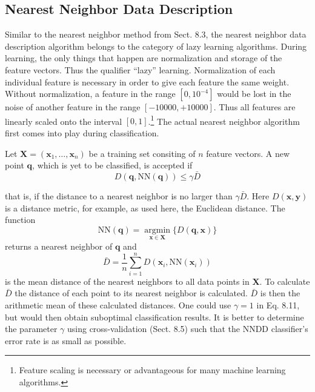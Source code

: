 \documentclass[10pt]{book}
\begin{document}
\subsection{Nearest Neighbor Data Description}
Similar to the nearest neighbor method from Sect. 8.3, the nearest neighbor data description algorithm belongs to the category of lazy learning algorithms. During learning, the only things that happen are normalization and storage of the feature vectors. Thus the qualifier ``lazy'' learning. Normalization of each individual feature is necessary in order to give each feature the same weight. Without normalization, a feature in the range $\left[0,10^{-4}\right]$ would be lost in the noise of another feature in the range $[-10000,+10000]$. Thus all features are linearly scaled onto the interval $[0,1]$.\footnote{Feature scaling is necessary or advantageous for many machine learning algorithms.} The actual nearest neighbor algorithm first comes into play during classification.

Let $\boldsymbol{X}=\left(\boldsymbol{x}_{1}, \ldots, \boldsymbol{x}_{n}\right)$ be a training set consiting of $n$ feature vectors. A new point $\boldsymbol{q}$, which is yet to be classified, is accepted if
\begin{equation*}
D(\boldsymbol{q}, \mathrm{NN}(\boldsymbol{q})) \leq \gamma \bar{D} \tag{8.11}
\end{equation*}

that is, if the distance to a nearest neighbor is no larger than $\gamma \bar{D}$. Here $D(\boldsymbol{x}, \boldsymbol{y})$ is a distance metric, for example, as used here, the Euclidean distance. The function
\[
\mathrm{NN}(\boldsymbol{q})=\underset{\boldsymbol{x} \in \boldsymbol{X}}{\operatorname{argmin}}\{D(\boldsymbol{q}, \boldsymbol{x})\}
\]
returns a nearest neighbor of $\boldsymbol{q}$ and
\[
\bar{D}=\frac{1}{n} \sum_{i=1}^{n} D\left(\boldsymbol{x}_{i}, \mathrm{NN}\left(\boldsymbol{x}_{i}\right)\right)
\]
is the mean distance of the nearest neighbors to all data points in $\boldsymbol{X}$. To calculate $\bar{D}$ the distance of each point to its nearest neighbor is calculated. $\bar{D}$ is then the arithmetic mean of these calculated distances. One could use $\gamma=1$ in Eq. 8.11, but would then obtain suboptimal classification results. It is better to determine the parameter $\gamma$ using cross-validation (Sect. 8.5) such that the NNDD classifier's error rate is as small as possible.
\end{document}
